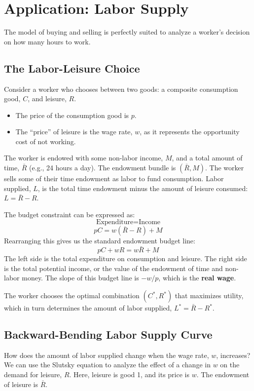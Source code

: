 \section{Application: Labor Supply}

The model of buying and selling is perfectly suited to analyze a worker's decision on how many hours to work.

\subsection{The Labor-Leisure Choice}

Consider a worker who chooses between two goods: a composite consumption good, $C$, and leisure, $R$.
\begin{itemize}
    \item The price of the consumption good is $p$.
    \item The ``price'' of leisure is the wage rate, $w$, as it represents the opportunity cost of not working.
\end{itemize}
The worker is endowed with some non-labor income, $M$, and a total amount of time, $\bar{R}$ (e.g., 24 hours a day). The endowment bundle is $(\bar{R}, M)$. The worker sells some of their time endowment as labor to fund consumption.
Labor supplied, $L$, is the total time endowment minus the amount of leisure consumed: $L = \bar{R} - R$.

The budget constraint can be expressed as:
\[
\text{Expenditure} = \text{Income}
\]
\[
pC = w(\bar{R} - R) + M
\]
Rearranging this gives us the standard endowment budget line:
\[
pC + wR = w\bar{R} + M
\]
The left side is the total expenditure on consumption and leisure. The right side is the total potential income, or the value of the endowment of time and non-labor money. The slope of this budget line is $-w/p$, which is the \textbf{real wage}.

The worker chooses the optimal combination $(C^*, R^*)$ that maximizes utility, which in turn determines the amount of labor supplied, $L^* = \bar{R} - R^*$.

\subsection{Backward-Bending Labor Supply Curve}

How does the amount of labor supplied change when the wage rate, $w$, increases? We can use the Slutsky equation to analyze the effect of a change in $w$ on the demand for leisure, $R$. Here, leisure is good 1, and its price is $w$. The endowment of leisure is $\bar{R}$.

